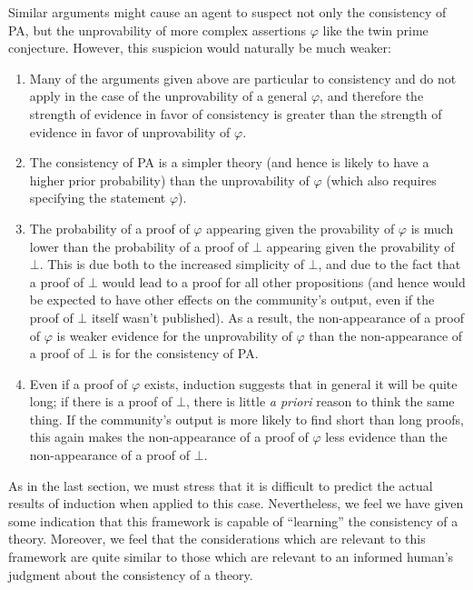 \documentclass[12pt]{article}
\theoremstyle{definition}
\newcommand{\vp}{\varphi}
\begin{document}
Similar arguments might cause an agent to suspect not only the consistency of PA, but the unprovability
of more complex assertions $\vp$ like the twin prime conjecture.
However, this suspicion would naturally be much weaker:
\begin{enumerate}
\item Many of the arguments given above are particular to consistency
and do not apply in the case of the unprovability of a general $\vp$,
and therefore the strength of evidence in favor of consistency is greater
than the strength of evidence in favor of unprovability of $\vp$.
\item The consistency of PA is a simpler theory (and hence is likely to have a higher prior probability)
than the unprovability of $\vp$ (which also requires specifying the statement $\vp$).
\item The probability of a proof of $\vp$ appearing given the provability of $\vp$
is much lower than the probability of a proof of $\bot$ appearing given the provability of $\bot$.
This is due both to the increased simplicity of $\bot$, and due to the fact that a proof of $\bot$
would lead to a proof for all other propositions (and hence would be expected
to have other effects on the community's output, even if the proof of $\bot$ itself wasn't published).
As a result, the non-appearance of a proof of $\vp$ is weaker evidence for the unprovability of $\vp$
than the non-appearance of a proof of $\bot$ is for the consistency of PA.
\item Even if a proof of $\vp$ exists,
induction suggests that in general it will be quite long;
if there is a proof of $\bot$, there is little \emph{a priori} reason to think
the same thing.
If the community's output is more likely to find short than long proofs,
this again makes the non-appearance of a proof of $\vp$ less evidence
than the non-appearance of a proof of $\bot$.
\end{enumerate}

As in the last section, we must stress that it is difficult to predict
the actual results of induction
when applied to this case.
Nevertheless, we feel we have given some indication that this framework
is capable of ``learning'' the consistency of a theory.
Moreover, we feel that the considerations which are relevant to this framework
are quite similar to those which are relevant to an informed human's judgment
about the consistency of a theory.

\end{document}
